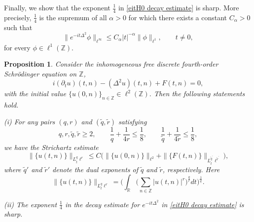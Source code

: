 \documentclass[reqno, 11pt]{amsart}
\newtheorem{proposition}[definition]{Proposition}
\newcommand\R{\mathbb{R}}
\newcommand\Z{\mathbb{Z}}
\numberwithin{equation}{section}
\begin{document}
Finally, we show that the exponent $\frac14$ in \eqref{eitH0 decay estimate} is sharp. More precisely, $\frac14$ is the supremum of all $\alpha>0$ for which there exists a constant $C_\alpha>0$ such that
\begin{equation}\label{sharness meaning}
\big\|e^{-it\Delta^2}\phi\big\|_{\ell^\infty}
\leq
C_\alpha |t|^{-\alpha}\|\phi\|_{\ell^1},
\qquad t\neq0,
\end{equation}
for every $\phi\in\ell^1(\Z)$.
\begin{proposition}\label{theorem of strichartz estimate}
Consider the inhomogeneous free discrete fourth-order Schr\"odinger equation on $\Z$,
$$i(\partial_tu)(t,n)-(\Delta^2u)(t,n)+F(t,n)=0,$$
with the initial value $\{u(0,n)\}_{n\in\Z}\in\ell^2(\Z)$. Then the following statements hold.

{\rm (i)} For any pairs $(q,r)$ and $(\widetilde q,\widetilde r)$ satisfying
$$q,r,\widetilde q,\widetilde r\geq2, \qquad \frac1q+\frac1{4r}\leq\frac18, \qquad \frac1{\widetilde q}+\frac1{4\widetilde r}\leq\frac18,$$
we have the Strichartz estimate
\begin{equation}\label{strichartz estimate}
\|\{u(t,n)\}\|_{L^{q}_t\ell^{r}}\leq C\big(\|\{u(0,n)\}\|_{\ell^2}+\|\{F(t,n)\}\|_{L^{\tilde{q}^{'}}_t\ell^{\tilde{r}^{'}}}\big),
\end{equation}
where $\widetilde q'$ and $\widetilde r'$ denote the dual exponents of $\widetilde q$ and $\widetilde r$, respectively. Here
$$\|\{u(t,n)\}\|_{L^{q}_t\ell^{r}}=\Big(\int_{\R}^{}\Big(\sum\limits_{n\in\Z}|u(t,n)|^{r}\Big)^{\frac{q}{r}}dt\Big)^{\frac{1}{q}}.$$

{\rm (ii)} The exponent $\frac14$ in the decay estimate for $e^{-it\Delta^2}$ in \eqref{eitH0 decay estimate} is sharp.
\end{proposition}
\end{document}
